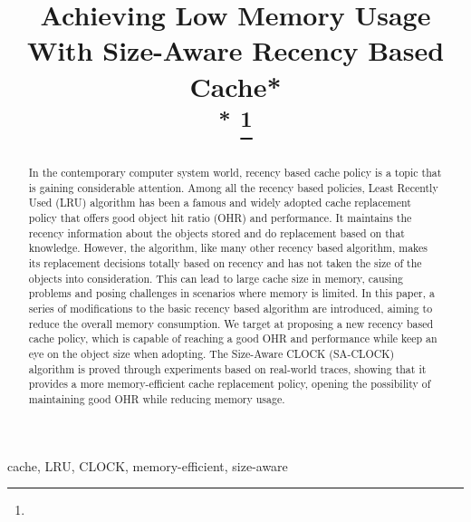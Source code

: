 \documentclass[conference]{IEEEtran}
\begin{document}
\title{Achieving Low Memory Usage With Size-Aware Recency Based Cache*\\
{\footnotesize \textsuperscript{*}}
\thanks{}
}

\author{
}

\maketitle

\begin{abstract}
	In the contemporary computer system world, recency based cache policy is a topic that is gaining considerable attention. Among all the recency based policies, Least Recently Used (LRU) algorithm has been a famous and widely adopted cache replacement policy that offers good object hit ratio (OHR) and performance. It maintains the recency information about the objects stored and do replacement based on that knowledge. However, the algorithm, like many other recency based algorithm, makes its replacement decisions totally based on recency and has not taken the size of the objects into consideration. This can lead to large cache size in memory, causing problems and posing challenges in scenarios where memory is limited. In this paper, a series of modifications to the basic recency based algorithm are introduced, aiming to reduce the overall memory consumption. We target at proposing a new recency based cache policy, which is capable of reaching a good OHR and performance while keep an eye on the object size when adopting. The Size-Aware CLOCK (SA-CLOCK) algorithm is proved through experiments based on real-world traces, showing that it provides a more memory-efficient cache replacement policy, opening the possibility of maintaining good OHR while reducing memory usage.
\end{abstract}

\begin{IEEEkeywords}
	cache, LRU, CLOCK, memory-efficient, size-aware
\end{IEEEkeywords}
\end{document}
